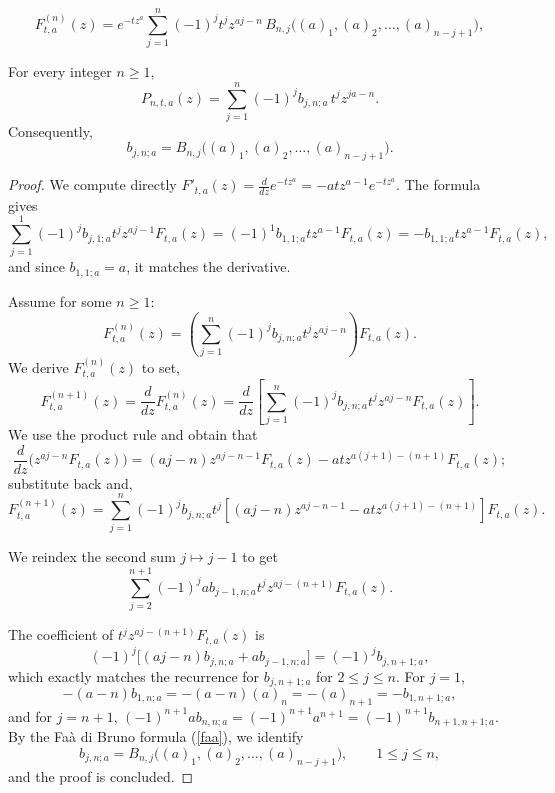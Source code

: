 \documentclass[10pt,a4paper]{amsart}
\begin{document}
\begin{equation}\label{faa}
F^{(n)}_{t,a}(z)
=
e^{-t z^a}
\sum_{j=1}^n
(-1)^j t^j z^{aj-n}
\,
B_{n,j}\!\big( (a)_1, (a)_2, \dots, (a)_{n-j+1} \big),
\end{equation}

\begin{theorem}\label{recur2}
For every integer $n\ge1$,
\begin{equation}
\label{mainformula}
P_{n,t,a}(z)=
\sum_{j=1}^{n}
(-1)^{j}b_{j,n;a}\,t^j z^{ja-n}.
\end{equation}
Consequently,
\[
b_{j,n;a}
=
B_{n,j}\!\big( (a)_1, (a)_2, \dots, (a)_{n-j+1} \big).
\]
\end{theorem}

\begin{proof} We compute directly $
F'_{t,a}(z) = \frac{d}{dz} e^{-t z^a} = -a t z^{a-1} e^{-t z^a}.$
The formula gives
\[
\sum_{j=1}^{1} (-1)^{j} b_{j,1;a} t^j z^{aj - 1} F_{t,a}(z) = (-1)^{1} b_{1,1;a} t z^{a-1} F_{t,a}(z) = -b_{1,1;a} t z^{a-1} F_{t,a}(z),
\]
and since $b_{1,1;a} = a$, it matches the derivative.

Assume for some $n \ge 1$:
\[
F^{(n)}_{t,a}(z) = \left( \sum_{j=1}^{n} (-1)^{j} b_{j,n;a} t^j z^{aj - n} \right) F_{t,a}(z).
\]
We derive $F^{(n)}_{t,a}(z)$ to set,
\[
F^{(n+1)}_{t,a}(z) = \frac{d}{dz} F^{(n)}_{t,a}(z)
= \frac{d}{dz} \left[ \sum_{j=1}^{n} (-1)^{j} b_{j,n;a} t^j z^{aj - n} F_{t,a}(z) \right].
\]
We use the product rule and obtain that
\[
\frac{d}{dz} \big( z^{aj - n} F_{t,a}(z) \big)
= (aj - n) z^{aj - n - 1} F_{t,a}(z) - a t z^{a(j+1) - (n+1)} F_{t,a}(z);
\]
substitute back and,
\[
F^{(n+1)}_{t,a}(z) = \sum_{j=1}^{n} (-1)^{j} b_{j,n;a} t^j \left[ (aj - n) z^{aj - n - 1} - a t z^{a(j+1) - (n+1)} \right] F_{t,a}(z).
\]

We reindex the second sum \(j \mapsto j-1\) to get
\[
\sum_{j=2}^{n+1} (-1)^{j} a b_{j-1,n;a} t^j z^{aj - (n+1)} F_{t,a}(z).
\]



The coefficient of \(t^j z^{aj - (n+1)} F_{t,a}(z)\) is
\[
(-1)^{j} \big[ (aj - n) b_{j,n;a} + a b_{j-1,n;a} \big] = (-1)^{j} b_{j,n+1;a},
\]
which exactly matches the recurrence for \(b_{j,n+1;a}\) for $2\le j\le n$. For $j=1$, $$-(a-n)b_{1,n;a}= -(a-n)(a)_n=-(a)_{n+1}= -b_{1,n+1;a},
$$
and for $j=n+1$, $(-1)^{n+1}a b_{n,n;a}= (-1)^{n+1}a^{n+1}= (-1)^{n+1}b_{n+1,n+1;a}$.  By the Fa\`a di Bruno formula (\ref{faa}), we identify
$$
b_{j,n;a}
=
B_{n,j}\!\big( (a)_1, (a)_2, \dots, (a)_{n-j+1} \big), \qquad 1\le j\le n,
$$
and the proof is concluded.
\end{proof}
\end{document}
